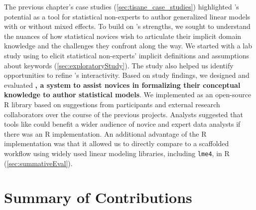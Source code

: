The previous chapter's case studies (\autoref{sec:tisane_case_studies})
highlighted \tisane's potential as a tool for statistical non-experts to author
generalized linear models with or without mixed effects. To build on \tisane's
strengths, we sought to understand the nuances of how statistical novices wish
to articulate their implicit domain knowledge and the challenges they confront
along the way. We started with a lab study using \tisane to elicit statistical
non-experts' implicit definitions and assumptions about \SDSL keywords
(\autoref{sec:exploratoryStudy}). The study also helped us identify
opportunities to refine \tisane's interactivity. Based on study findings, we
designed and evaluated \textbf{\rTisane, a system to assist novices in
formalizing their conceptual knowledge to author statistical models}. We
implemented \rTisane as an open-source R library based on suggestions from
participants and external research collaborators over the course of the previous
projects. Analysts suggested that tools like \tisane could benefit a wider
audience of novice and expert data analysts if there was an R implementation.
An additional advantage of the R implementation was that it allowed us to directly
compare \rTisane to a scaffolded workflow using widely used linear modeling
libraries, including \texttt{lme4}, in R (\autoref{sec:summativeEval}). 










\section{Summary of Contributions}


